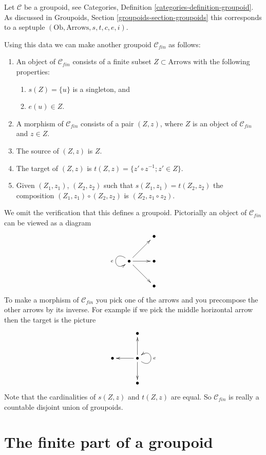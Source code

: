 \documentclass{stacks-project}
\theoremstyle{plain}
\theoremstyle{definition}
\theoremstyle{remark}
\numberwithin{equation}{subsection}
\begin{document}
\noindent
Let $\mathcal{C}$ be a groupoid, see
Categories, Definition \ref{categories-definition-groupoid}.
As discussed in
Groupoids, Section \ref{groupoids-section-groupoids}
this corresponds to a septuple $(\text{Ob}, \text{Arrows}, s, t, c, e, i)$.

\medskip\noindent
Using this data we can make another groupoid $\mathcal{C}_{fin}$
as follows:
\begin{enumerate}
\item An object of $\mathcal{C}_{fin}$ consists of a finite subset
$Z \subset \text{Arrows}$ with the following properties:
\begin{enumerate}
\item $s(Z) = \{u\}$ is a singleton, and
\item $e(u) \in Z$.
\end{enumerate}
\item A morphism of $\mathcal{C}_{fin}$ consists of a pair
$(Z, z)$, where $Z$ is an object of $\mathcal{C}_{fin}$ and
$z \in Z$.
\item The source of $(Z, z)$ is $Z$.
\item The target of $(Z, z)$ is $t(Z, z) = \{z' \circ z^{-1}; z' \in Z\}$.
\item Given $(Z_1, z_1)$, $(Z_2, z_2)$ such that $s(Z_1, z_1) = t(Z_2, z_2)$
the composition $(Z_1, z_1) \circ (Z_2, z_2)$ is $(Z_2, z_1 \circ z_2)$.
\end{enumerate}
We omit the verification that this defines a groupoid.
Pictorially an object of $\mathcal{C}_{fin}$ can be viewed
as a diagram
$$
\xymatrix{
& \bullet \\
\bullet \ar@(ul, dl)[]_e \ar[ru] \ar[r] \ar[rd] & \bullet \\
& \bullet
}
$$
To make a morphism of $\mathcal{C}_{fin}$ you pick one of the arrows
and you precompose the other arrows by its inverse. For example if we pick
the middle horizontal arrow then the target is the picture
$$
\xymatrix{
& \bullet \\
\bullet & \bullet \ar[l] \ar[u] \ar@(dr, ur)[]_e \ar[d] \\
& \bullet
}
$$
Note that the cardinalities of $s(Z, z)$ and $t(Z, z)$ are equal.
So $\mathcal{C}_{fin}$ is really a countable disjoint union of
groupoids.




\section{The finite part of a groupoid}
\label{section-finite-part-groupoid}
\end{document}
